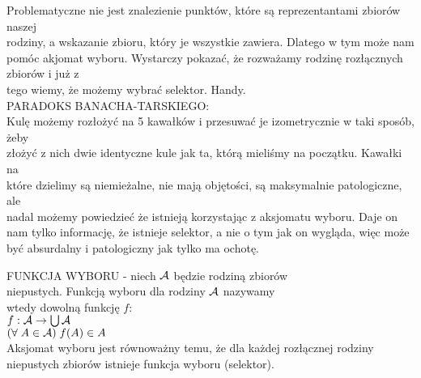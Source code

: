 Problematyczne nie jest znalezienie punktów, które są reprezentantami zbiorów naszej \\rodziny, a wskazanie zbioru, który je wszystkie zawiera. Dlatego w tym może nam pomóc akjomat wyboru. Wystarczy pokazać, że rozważamy rodzinę rozłącznych zbiorów i już z \\tego wiemy, że możemy wybrać selektor. Handy.\bigskip\\
{\large\color{emp}PARADOKS BANACHA-TARSKIEGO:}\medskip\\
Kulę możemy rozłożyć na {\color{acc}5 kawałków} i przesuwać je izometrycznie w taki sposób, żeby \\złożyć z nich {\color{acc}dwie identyczne kule} jak ta, którą mieliśmy na początku. Kawałki na \\które dzielimy są niemieżalne, nie mają objętości, są maksymalnie patologiczne, ale \\nadal możemy powiedzieć że istnieją korzystając z aksjomatu wyboru. Daje on nam tylko informację, że {\color{acc}istnieje selektor, a nie o tym jak on wygląda,} więc może być absurdalny i patologiczny jak tylko ma ochotę.\bigskip
\begin{center}\large
    {\color{def}FUNKCJA WYBORU} - niech $\mathcal{A}$ będzie rodziną zbiorów \\niepustych. Funkcją wyboru dla rodziny $\mathcal{A}$ nazywamy \\wtedy {\color{acc}dowolną funkcję $f$:}\smallskip\\
    $f:\mathcal{A}\to\bigcup \mathcal{A}$\smallskip\\
    $(\forall\;A\in\mathcal{A})\;f(A)\in A$\medskip\\
    \normalsize Aksjomat wyboru jest równoważny temu, że dla każdej rozłącznej rodziny niepustych zbiorów istnieje funkcja wyboru (selektor).
\end{center}
